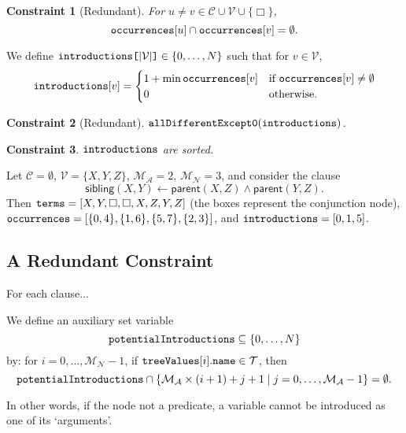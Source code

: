 \documentclass[runningheads]{llncs}
\newtheorem{constraint}{Constraint}
\newcommand{\variable}[1]{\texttt{\textup{#1}}}
\newcommand{\arrayd}[3]{\variable{{#1}[}{#2}\variable{]} \in {#3}}
\newcommand{\variables}{\mathcal{V}}
\newcommand{\constants}{\mathcal{C}}
\newcommand{\tokens}{\mathcal{T}}
\newcommand{\maxArity}{\mathcal{M}_{\mathcal{A}}}
\newcommand{\maxNumNodes}{\mathcal{M}_{\mathcal{N}}}
\begin{document}
\begin{constraint}[Redundant]
  For $u \ne v \in \constants{} \cup \variables{} \cup \{ \Box \}$,
  \[
    \variable{occurrences}[u] \cap \variable{occurrences}[v] = \emptyset.
  \]
\end{constraint}

\begin{definition}
  We define $\arrayd{introductions}{|\variables{}|}{\{ 0, \dots, N \}}$ such
  that for $v \in \variables{}$,
  \[
    \variable{introductions}[v] = \begin{cases}
      1 + \min \variable{occurrences}[v] & \text{if }
      \variable{occurrences}[v] \ne \emptyset\\
      0 & \text{otherwise.}
    \end{cases}
  \]
\end{definition}

\begin{constraint}[Redundant]
  $\variable{allDifferentExcept0}(\variable{introductions})$.
\end{constraint}

\begin{constraint}
  $\variable{introductions}$ are sorted.
\end{constraint}

\begin{example}
  Let $\constants{} = \emptyset$, $\variables{} = \{ X, Y, Z \}$, $\maxArity{} =
  2$, $\maxNumNodes{} = 3$, and consider the clause
  \[
    \mathsf{sibling}(X, Y) \gets \mathsf{parent}(X, Z) \land
    \mathsf{parent}(Y, Z).
  \]
  Then $\variable{terms} = [X, Y, \Box, \Box, X, Z, Y, Z]$ (the boxes represent
  the conjunction node), $\variable{occurrences} = [\{ 0, 4 \}, \{ 1, 6 \},
  \{ 5, 7 \}, \{ 2, 3 \}]$, and $\variable{introductions} = [0, 1, 5]$.
\end{example}

\subsection{A Redundant Constraint}

For each clause...

\begin{definition}
  We define an auxiliary set variable
  \[
    \variable{potentialIntroductions} \subseteq \{ 0, \dots, N \}
  \]
  by: for $i = 0, \dots, \maxNumNodes{} - 1$, if
  $\variable{treeValues}[i].\variable{name} \in \tokens{}$, then
  \[
    \variable{potentialIntroductions} \cap \{ \maxArity{} \times (i + 1) + j + 1
    \mid j = 0, \dots, \maxArity{} - 1 \} = \emptyset.
  \]
\end{definition} %
In other words, if the node not a predicate, a variable cannot be introduced as
one of its `arguments'.
\end{document}
